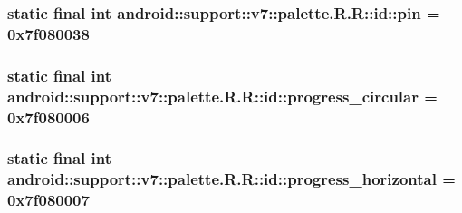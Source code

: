 \hypertarget{classandroid_1_1support_1_1v7_1_1palette_1_1_r_1_1id_2d9954003119340339f6f2102ff15b7c}{
\subsubsection[{pin}]{\setlength{\rightskip}{0pt plus 5cm}static final int android::support::v7::palette.R.R::id::pin = 0x7f080038}}
\label{classandroid_1_1support_1_1v7_1_1palette_1_1_r_1_1id_2d9954003119340339f6f2102ff15b7c}


\hypertarget{classandroid_1_1support_1_1v7_1_1palette_1_1_r_1_1id_ebdbc2b49ceebf7079adb8108470de74}{
\subsubsection[{progress\_\-circular}]{\setlength{\rightskip}{0pt plus 5cm}static final int android::support::v7::palette.R.R::id::progress\_\-circular = 0x7f080006}}
\label{classandroid_1_1support_1_1v7_1_1palette_1_1_r_1_1id_ebdbc2b49ceebf7079adb8108470de74}


\hypertarget{classandroid_1_1support_1_1v7_1_1palette_1_1_r_1_1id_ecf16bb9cb416572d72aae4f7ba0f6c7}{
\subsubsection[{progress\_\-horizontal}]{\setlength{\rightskip}{0pt plus 5cm}static final int android::support::v7::palette.R.R::id::progress\_\-horizontal = 0x7f080007}}
\label{classandroid_1_1support_1_1v7_1_1palette_1_1_r_1_1id_ecf16bb9cb416572d72aae4f7ba0f6c7}


